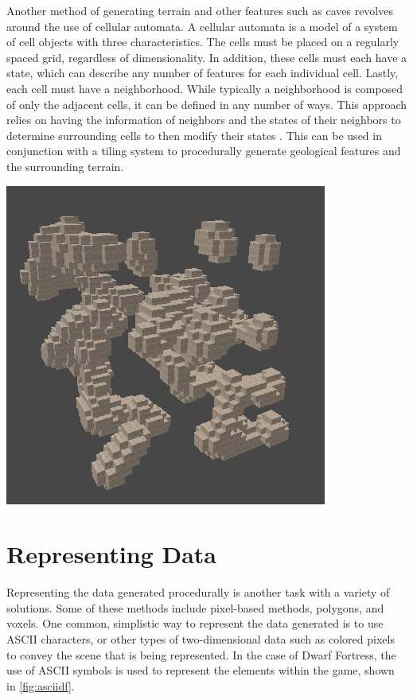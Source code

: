 \documentclass[10pt]{report}
\begin{document}
		Another method of generating terrain and other features such as caves \cite{10.1145/1814256.1814266} revolves around the use of cellular automata. A cellular automata is a model of a system of cell objects with three characteristics. The cells must be placed on a regularly spaced grid, regardless of dimensionality. In addition, these cells must each have a state, which can describe any number of features for each individual cell. Lastly, each cell must have a neighborhood. While typically a neighborhood is composed of only the adjacent cells, it can be defined in any number of ways. This approach relies on having the information of neighbors and the states of their neighbors to determine surrounding cells to then modify their states \cite{nature-of-code}. This can be used in conjunction with a tiling system to procedurally generate geological features and the surrounding terrain.
		
		\begin{minipage}{\textwidth}
			\centering
			\includegraphics[scale=.75]{cellular-automata-cave}
			\label{fig:ca-cave}
		\end{minipage}
		
		\section{Representing Data}
	
		Representing the data generated procedurally is another task with a variety of solutions. Some of these methods include pixel-based methods, polygons, and voxels. One common, simplistic way to represent the data generated is to use ASCII characters, or other types of two-dimensional data such as colored pixels to convey the scene that is being represented. In the case of Dwarf Fortress, the use of ASCII symbols is used to represent the elements within the game, shown in \autoref{fig:asciidf}.
		
\end{document}
